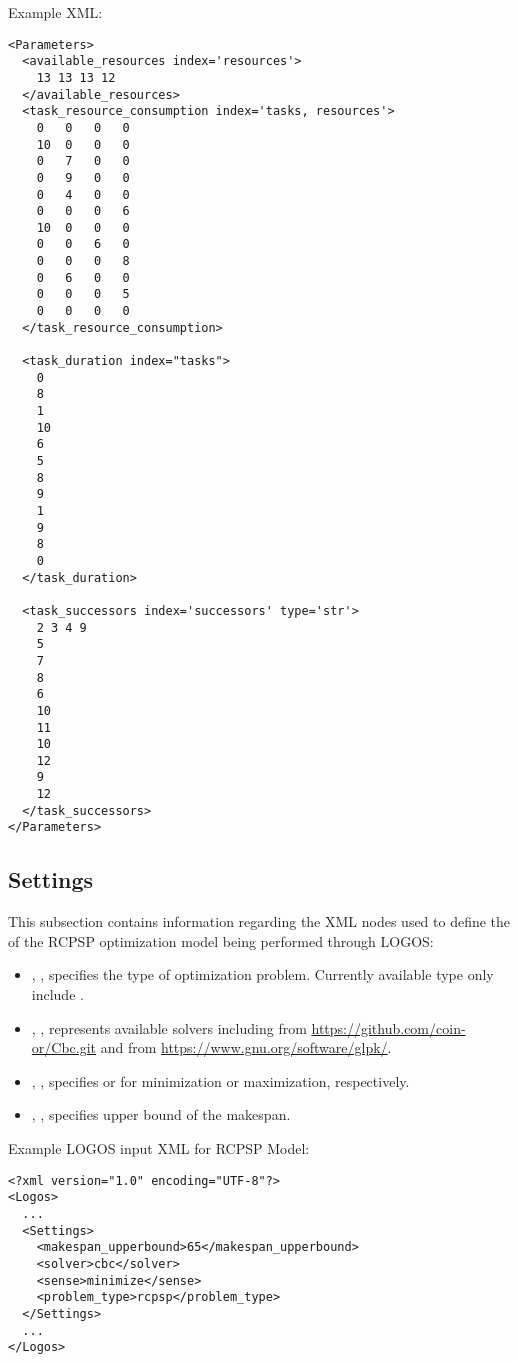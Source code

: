 Example XML:
\begin{lstlisting}[style=XML]
<Parameters>
  <available_resources index='resources'>
    13 13 13 12
  </available_resources>
  <task_resource_consumption index='tasks, resources'>
    0	0	0	0
    10	0	0	0
    0	7	0	0
    0	9	0	0
    0	4	0	0
    0	0	0	6
    10	0	0	0
    0	0	6	0
    0	0	0	8
    0	6	0	0
    0	0	0	5
    0	0	0	0
  </task_resource_consumption>

  <task_duration index="tasks">
    0
    8
    1
    10
    6
    5
    8
    9
    1
    9
    8
    0
  </task_duration>

  <task_successors index='successors' type='str'>
    2 3 4 9
    5
    7
    8
    6
    10
    11
    10
    12
    9
    12
  </task_successors>
</Parameters>
\end{lstlisting}

\subsection{Settings}
\label{subsec:rcpsp_settings}

This subsection contains information regarding the XML nodes used to define the
 of the RCPSP optimization model being performed through LOGOS:
\begin{itemize}
  \item {}, , specifies the type of
  optimization problem. Currently available type only include .
  \item {}, , represents available solvers including
   from \url{https://github.com/coin-or/Cbc.git} and  from
  \url{https://www.gnu.org/software/glpk/}.
  \item {}, , specifies 
  or  for minimization or maximization, respectively.
  \item {}, ,
  specifies upper bound of the makespan.
\end{itemize}

Example LOGOS input XML for RCPSP Model:
\begin{lstlisting}[style=XML]
<?xml version="1.0" encoding="UTF-8"?>
<Logos>
  ...
  <Settings>
    <makespan_upperbound>65</makespan_upperbound>
    <solver>cbc</solver>
    <sense>minimize</sense>
    <problem_type>rcpsp</problem_type>
  </Settings>
  ...
</Logos>
\end{lstlisting}
